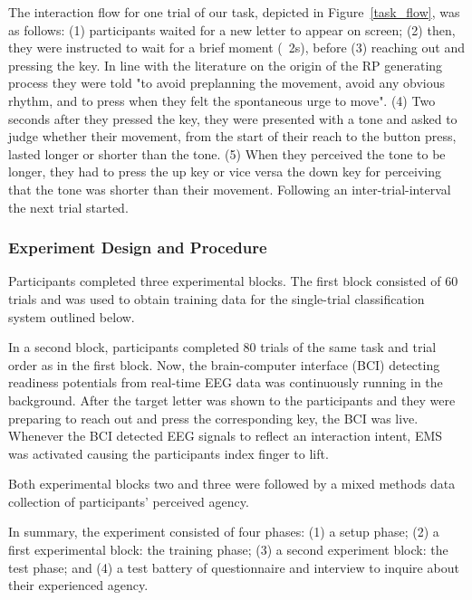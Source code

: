 The interaction flow for one trial of our task, depicted in Figure~\ref{task_flow}, was as follows: (1) participants waited for a new letter to appear on screen; (2) then, they were instructed to wait for a brief moment (~2s), before (3) reaching out and pressing the key. In line with the literature on the origin of the RP generating process they were told "to avoid preplanning the movement, avoid any obvious rhythm, and to press when they felt the spontaneous urge to move". (4) Two  seconds after they pressed the key, they were presented with a tone and asked to judge whether their movement, from the start of their reach to the button press, lasted longer or shorter than the tone. (5) When they perceived the tone to be longer, they had to press the up key or vice versa the down key for perceiving that the tone was shorter than their movement. Following an inter-trial-interval the next trial started.

\subsubsection{Experiment Design and Procedure}
Participants completed three experimental blocks. The first block consisted of 60 trials and was used to obtain training data for the single-trial classification system outlined below. 


In a second block, participants completed 80 trials of the same task and trial order as in the first block. Now, the brain-computer interface (BCI) detecting readiness potentials from real-time EEG data was continuously running in the background. After the target letter was shown to the participants and they were preparing to reach out and press the corresponding key, the BCI was live. Whenever the BCI detected EEG signals to reflect an interaction intent, EMS was activated causing the participants index finger to lift. 


Both experimental blocks two and three were followed by a mixed methods data collection of participants' perceived agency.

In summary, the experiment consisted of four phases: (1) a setup phase; (2) a first experimental block: the training phase; (3) a second experiment block: the test phase; and (4) a test battery of questionnaire and interview to inquire about their experienced agency.

